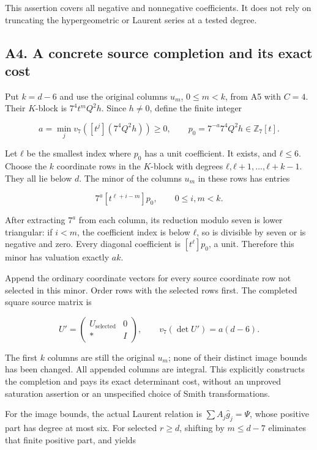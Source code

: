 \documentclass[11pt,a4paper]{article}
\begin{document}
This assertion covers all negative and nonnegative coefficients. It does not rely on truncating the hypergeometric or Laurent series at a tested degree.

\hypertarget{a4.-a-concrete-source-completion-and-its-exact-cost}{%
\subsection{A4. A concrete source completion and its exact cost}\label{a4.-a-concrete-source-completion-and-its-exact-cost}}

Put \(k=d-6\) and use the original columns \(u_m\), \(0≤m<k\), from A5 with \(C=4\). Their \(K\)-block is \(7^{4}t^mQ^{2}h\). Since \(h≠0\), define the finite integer

\[
a=\min_j v_7([t^j](7^4Q^2h))\ge0,
\qquad p_0=7^{-a}7^4Q^2h\in\mathbb Z_7[t].
\]

Let \(ℓ\) be the smallest index where \(p_{0}\) has a unit coefficient. It exists, and \(ℓ≤6\). Choose the \(k\) coordinate rows in the \(K\)-block with degrees \(ℓ,ℓ+1,\ldots ,ℓ+k-1\). They all lie below \(d\). The minor of the columns \(u_m\) in these rows has entries

\[
7^a[t^{\ell+i-m}]p_0,\qquad0\le i,m<k.
\]

After extracting \(7^a\) from each column, its reduction modulo seven is lower triangular: if \(i<m\), the coefficient index is below \(ℓ\), so is divisible by seven or is negative and zero. Every diagonal coefficient is \([t^ℓ]p_{0}\), a unit. Therefore this minor has valuation exactly \(ak\).

Append the ordinary coordinate vectors for every source coordinate row not selected in this minor. Order rows with the selected rows first. The completed square source matrix is

\[
U'=\begin{pmatrix}U_{\mathrm{selected}}&0\\ *&I\end{pmatrix},
\qquad v_7(\det U')=a(d-6).
\]

The first \(k\) columns are still the original \(u_m\); none of their distinct image bounds has been changed. All appended columns are integral. This explicitly constructs the completion and pays its exact determinant cost, without an unproved saturation assertion or an unspecified choice of Smith transformations.

For the image bounds, the actual Laurent relation is \(\sum A_j\widehat{g}_j=Ψ\), whose positive part has degree at most six. For selected \(r≥d\), shifting by \(m≤d-7\) eliminates that finite positive part, and yields
\end{document}
